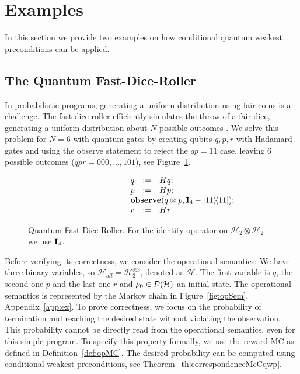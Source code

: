 \documentclass[a4paper,UKenglish,cleveref, autoref, thm-restate]{lipics-v2021}
\begin{document}
%
 \section{Examples}
\label{sec:example}
In this section we provide two examples on how conditional quantum weakest preconditions can be applied.
\subsection{The Quantum Fast-Dice-Roller}
In probabilistic programs, generating a uniform distribution using fair coins is a challenge. The fast dice roller efficiently simulates the throw of a fair dice, generating a uniform distribution about $N$ possible outcomes \cite{lumbroso}. We solve this problem for $N=6$ with quantum gates by creating qubits $q,p,r$ with Hadamard gates and using the observe statement to reject the $qp=11$ case, leaving $6$ possible outcomes ($qpr=000, \ldots , 101$), see Figure~\ref{fig:fdr}.

\begin{figure}
  \[\begin{array}{lcl}
      q   & \df & H q;\\
      p & \df & H p;\\
      \mathbf{observe}(q \otimes p, \identityOp_4 - \ketbra{11}{11});\hskip-2in {}\\
      r   & \df & H r
    \end{array}
  \]
  \caption{Quantum Fast-Dice-Roller. For the identity operator on $\mathcal{H}_2 \otimes \mathcal{H}_2$ we use $\textbf{I}_4$.}
  \label{fig:fdr}
\end{figure}

Before verifying its correctness, we consider the operational semantics:
We have three binary variables, so $\mathcal{H}_{all} = \mathcal{H}_2 ^{\otimes 3}$, denoted as $\mathcal{H}$. The first variable is $q$, the second one $p$ and the last one $r$ and $\rho_0 \in \mathcal{D}(\mathcal{H})$ an initial state. The operational semantics is represented by the Markov chain in Figure~\ref{fig:opSem}, Appendix~\ref{app:ex}.
To prove correctness, we focus on the probability of termination and reaching the desired state without violating the observation. This probability cannot be directly read from the operational semantics, even for this simple program. To specify this property formally, we use the reward MC as defined in Definition~\ref{def:opMC}. The desired probability can be computed using conditional weakest preconditions, see Theorem~\ref{th:correspondenceMcCqwp}.
\end{document}
